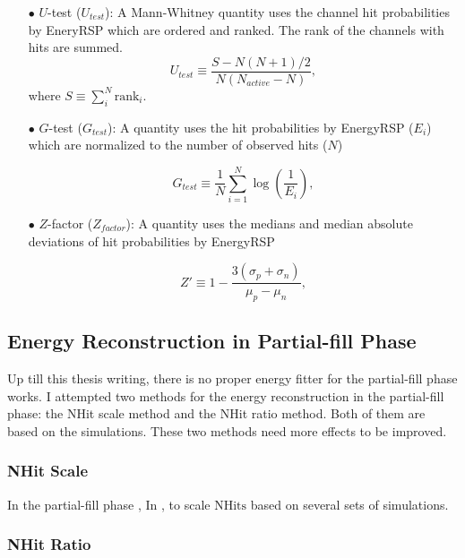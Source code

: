 \begin{itemize}
	
	\item[$\bullet$]$U$-test ($U_{test}$):
	A Mann-Whitney quantity uses the channel hit probabilities by EneryRSP which are ordered and ranked. The rank of the channels with hits are summed.%
		\begin{equation}
		U_{test}\equiv \frac{S-N(N+1)/2}{N(N_{active}-N)},
		\end{equation}
	where $S\equiv \sum_{i}^N \mathrm{rank}_i$. 
	
	\item[$\bullet$] $G$-test ($G_{test}$):
	A quantity uses the hit probabilities by EnergyRSP ($E_i$) which are normalized to the number of observed hits ($N$) %
	
	\begin{equation}
	G_{test}\equiv \frac{1}{N}\sum_{i=1}^N \log(\frac{1}{E_i}),
	\end{equation}
	
	\item[$\bullet$] $Z$-factor ($Z_{factor}$):
	A quantity uses the medians and median absolute deviations
of hit probabilities by EnergyRSP
	
	\begin{equation}
     Z'\equiv 1-\frac{3(\sigma_p+\sigma_n)}{\mu_p-\mu_n},
    \end{equation}
\end{itemize}

\subsection{Energy Reconstruction in Partial-fill Phase}
Up till this thesis writing, there is no proper energy fitter for the partial-fill phase works. I attempted two methods for the energy reconstruction in the partial-fill phase: the NHit scale method and the NHit ratio method. Both of them are based on the simulations. These two methods need more effects to be improved.
\subsubsection{NHit Scale}
In the partial-fill phase ,  In \cite{partialEnergy}, 
to scale $\mathrm{NHits}$ based on several sets of simulations.

\subsubsection{NHit Ratio}

